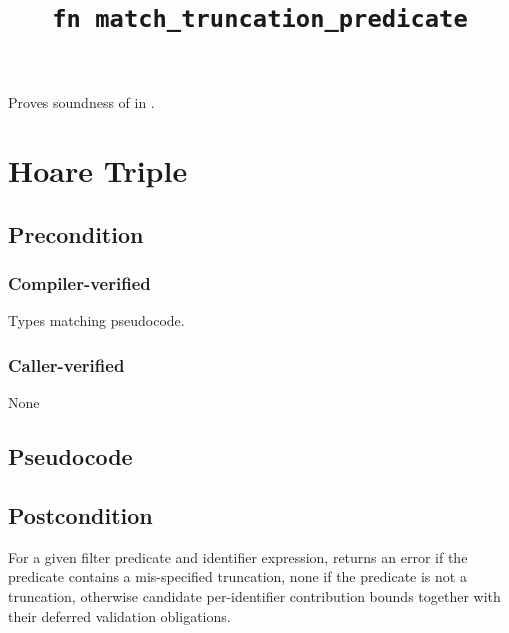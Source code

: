 \documentclass{article}
\title{\texttt{fn match\_truncation\_predicate}}
\author{\MichaelShoemateAuthor}
\begin{document}
\maketitle


\contrib

Proves soundness of 
in .

\section{Hoare Triple}
\subsection*{Precondition}
\subsubsection*{Compiler-verified}
Types matching pseudocode.

\subsubsection*{Caller-verified}
None

\subsection*{Pseudocode}
\label{sec:python-pseudocode}


\subsection*{Postcondition}
\begin{theorem}[Postcondition]
    For a given filter predicate and identifier expression,
    returns an error if the predicate contains a mis-specified truncation,
    none if the predicate is not a truncation,
    otherwise candidate per-identifier contribution bounds together with their deferred validation obligations.
\end{theorem}
\end{document}
